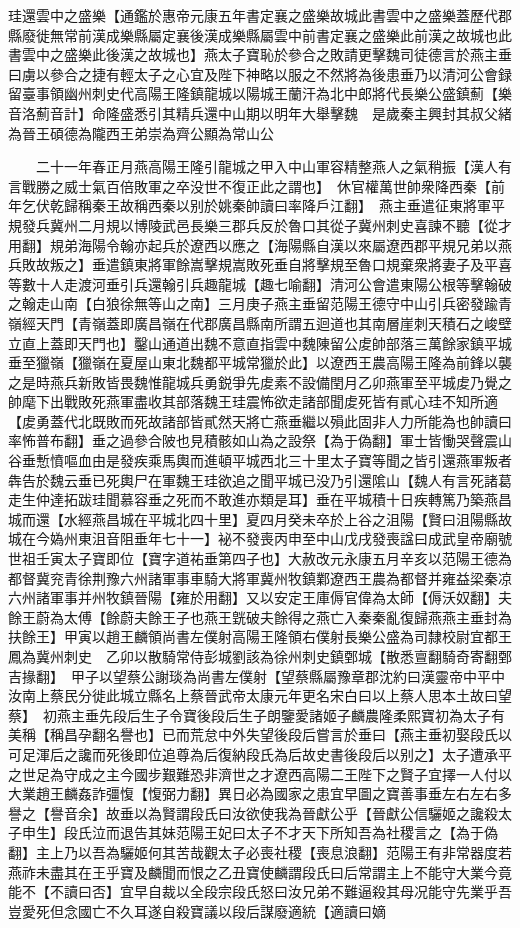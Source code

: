珪還雲中之盛樂【通鑑於惠帝元康五年書定襄之盛樂故城此書雲中之盛樂蓋歷代郡縣廢徙無常前漢成樂縣屬定襄後漢成樂縣屬雲中前書定襄之盛樂此前漢之故城也此書雲中之盛樂此後漢之故城也】燕太子寶恥於參合之敗請更擊魏司徒德言於燕主垂曰虜以參合之捷有輕太子之心宜及陛下神略以服之不然將為後患垂乃以清河公會録留臺事領幽州刺史代高陽王隆鎮龍城以陽城王蘭汗為北中郎將代長樂公盛鎮薊【樂音洛薊音計】命隆盛悉引其精兵還中山期以明年大舉擊魏　是歲秦主興封其叔父緒為晉王碩德為隴西王弟崇為齊公顯為常山公

　　二十一年春正月燕高陽王隆引龍城之甲入中山軍容精整燕人之氣稍振【漢人有言戰勝之威士氣百倍敗軍之卒没世不復正此之謂也】　休官權萬世帥衆降西秦【前年乞伏乾歸稱秦王故稱西秦以别於姚秦帥讀曰率降戶江翻】　燕主垂遣征東將軍平規發兵冀州二月規以博陵武邑長樂三郡兵反於魯口其從子冀州刺史喜諫不聽【從才用翻】規弟海陽令翰亦起兵於遼西以應之【海陽縣自漢以來屬遼西郡平規兄弟以燕兵敗故叛之】垂遣鎮東將軍餘嵩擊規嵩敗死垂自將擊規至魯口規棄衆將妻子及平喜等數十人走渡河垂引兵還翰引兵趣龍城【趣七喻翻】清河公會遣東陽公根等擊翰破之翰走山南【白狼徐無等山之南】三月庚子燕主垂留范陽王德守中山引兵密發踰青嶺經天門【青嶺蓋即廣昌嶺在代郡廣昌縣南所謂五迴道也其南層崖刺天積石之峻壁立直上蓋即天門也】鑿山通道出魏不意直指雲中魏陳留公䖍帥部落三萬餘家鎮平城垂至獵嶺【獵嶺在夏屋山東北魏都平城常獵於此】以遼西王農高陽王隆為前鋒以襲之是時燕兵新敗皆畏魏惟龍城兵勇鋭爭先䖍素不設備閏月乙卯燕軍至平城䖍乃覺之帥麾下出戰敗死燕軍盡收其部落魏王珪震怖欲走諸部聞䖍死皆有貳心珪不知所適【䖍勇蓋代北既敗而死故諸部皆貳然天將亡燕垂繼以殞此固非人力所能為也帥讀曰率怖普布翻】垂之過參合陂也見積骸如山為之設祭【為于偽翻】軍士皆慟哭聲震山谷垂慙憤嘔血由是發疾乘馬輿而進頓平城西北三十里太子寶等聞之皆引還燕軍叛者犇告於魏云垂已死輿尸在軍魏王珪欲追之聞平城已没乃引還隂山【魏人有言死諸葛走生仲達拓跋珪聞慕容垂之死而不敢進亦類是耳】垂在平城積十日疾轉篤乃築燕昌城而還【水經燕昌城在平城北四十里】夏四月癸未卒於上谷之沮陽【賢曰沮陽縣故城在今媯州東沮音阻垂年七十一】袐不發喪丙申至中山戊戌發喪諡曰成武皇帝廟號世祖壬寅太子寶即位【寶字道祐垂第四子也】大赦改元永康五月辛亥以范陽王德為都督冀兖青徐荆豫六州諸軍事車騎大將軍冀州牧鎮鄴遼西王農為都督并雍益梁秦凉六州諸軍事并州牧鎮晉陽【雍於用翻】又以安定王庫傉官偉為太師【傉沃奴翻】夫餘王蔚為太傅【餘蔚夫餘王子也燕王皝破夫餘得之燕亡入秦秦亂復歸燕燕主垂封為扶餘王】甲寅以趙王麟領尚書左僕射高陽王隆領右僕射長樂公盛為司隸校尉宜都王鳳為冀州刺史　乙卯以散騎常侍彭城劉該為徐州刺史鎮鄄城【散悉亶翻騎奇寄翻鄄吉掾翻】　甲子以望蔡公謝琰為尚書左僕射【望蔡縣屬豫章郡沈約曰漢靈帝中平中汝南上蔡民分徙此城立縣名上蔡晉武帝太康元年更名宋白曰以上蔡人思本土故曰望蔡】　初燕主垂先段后生子令寶後段后生子朗鑒愛諸姬子麟農隆柔熙寶初為太子有美稱【稱昌孕翻名譽也】已而荒怠中外失望後段后嘗言於垂曰【燕主垂初娶段氏以可足渾后之讒而死後即位追尊為后復納段氏為后故史書後段后以别之】太子遭承平之世足為守成之主今國步艱難恐非濟世之才遼西高陽二王陛下之賢子宜擇一人付以大業趙王麟姦詐彊愎【愎弼力翻】異日必為國家之患宜早圖之寶善事垂左右左右多譽之【譽音余】故垂以為賢謂段氏曰汝欲使我為晉獻公乎【晉獻公信驪姬之讒殺太子申生】段氏泣而退告其妹范陽王妃曰太子不才天下所知吾為社稷言之【為于偽翻】主上乃以吾為驪姬何其苦哉觀太子必喪社稷【喪息浪翻】范陽王有非常器度若燕祚未盡其在王乎寶及麟聞而恨之乙丑寶使麟謂段氏曰后常謂主上不能守大業今竟能不【不讀曰否】宜早自裁以全段宗段氏怒曰汝兄弟不難逼殺其母况能守先業乎吾豈愛死但念國亡不久耳遂自殺寶議以段后謀廢適統【適讀曰嫡